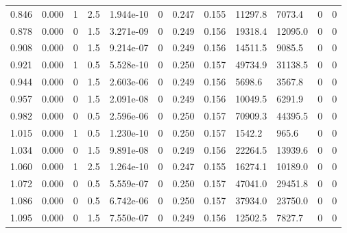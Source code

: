 \documentclass[preview]{standalone}
\begin{document}
{{\begin{tabular}{L{1.2cm}C{1.2cm} C{0.3cm}C{0.5cm} C{1.4cm}C{1.4cm} C{1.4cm}C{1.4cm} C{1.6cm}C{1.6cm} C{1.6cm}C{1.6cm}}
  0.846  &  0.000  & 1     & 2.5 &  1.944e-10  & 0  &  0.247&   0.155& 11297.8 & 7073.4   &  0 & 0  \\ 
  0.878  &  0.000  & 0     & 1.5 &  3.271e-09  & 0  &  0.249&   0.156& 19318.4 & 12095.0   &  0 & 0  \\ 
  0.908  &  0.000  & 0     & 1.5 &  9.214e-07  & 0  &  0.249&   0.156& 14511.5 & 9085.5   &  0 & 0  \\ 
  0.921  &  0.000  & 1     & 0.5 &  5.528e-10  & 0  &  0.250&   0.157& 49734.9 & 31138.5   &  0 & 0  \\ 
  0.944  &  0.000  & 0     & 1.5 &  2.603e-06  & 0  &  0.249&   0.156& 5698.6 & 3567.8   &  0 & 0  \\ 
  0.957  &  0.000  & 0     & 1.5 &  2.091e-08  & 0  &  0.249&   0.156& 10049.5 & 6291.9   &  0 & 0  \\ 
  0.982  &  0.000  & 0     & 0.5 &  2.596e-06  & 0  &  0.250&   0.157& 70909.3 & 44395.5   &  0 & 0  \\ 
  1.015  &  0.000  & 1     & 0.5 &  1.230e-10  & 0  &  0.250&   0.157& 1542.2 & 965.6   &  0 & 0  \\ 
  1.034  &  0.000  & 0     & 1.5 &  9.891e-08  & 0  &  0.249&   0.156& 22264.5 & 13939.6   &  0 & 0  \\ 
  1.060  &  0.000  & 1     & 2.5 &  1.264e-10  & 0  &  0.247&   0.155& 16274.1 & 10189.0   &  0 & 0  \\ 
  1.072  &  0.000  & 0     & 0.5 &  5.559e-07  & 0  &  0.250&   0.157& 47041.0 & 29451.8   &  0 & 0  \\ 
  1.086  &  0.000  & 0     & 0.5 &  6.742e-06  & 0  &  0.250&   0.157& 37934.0 & 23750.0   &  0 & 0  \\ 
  1.095  &  0.000  & 0     & 1.5 &  7.550e-07  & 0  &  0.249&   0.156& 12502.5 & 7827.7   &  0 & 0  \\ 
\hline 
\end{tabular} 

}}
\end{document}
